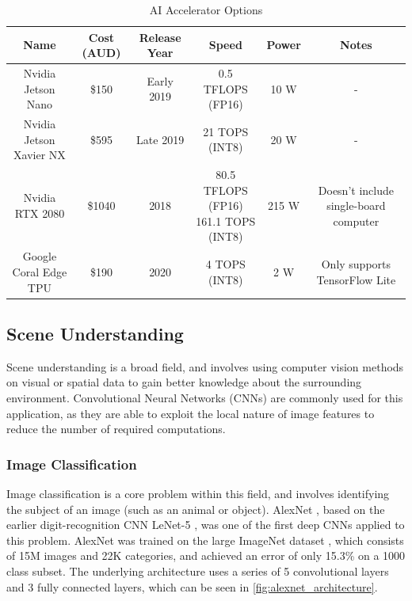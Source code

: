 \documentclass[12pt]{article}
\begin{document}
\begin{table}[H]
    \centering
\begin{adjustbox}{width=\textwidth}
    \begin{tabular}{c c c c c c}
    \toprule
    Name & Cost (AUD)\footnotemark[1] & Release Year & Speed & Power & Notes \\
    \midrule
    Nvidia Jetson Nano \cite{nvidiaJetsonNanoSystemonModule2019} & \$150 & Early 2019 & 0.5 TFLOPS (FP16) & 10 W & - \\
    Nvidia Jetson Xavier NX \cite{nvidiaJetsonXavierNX2019} & \$595 & Late 2019 & 21 TOPS (INT8) & 20 W & - \\
    Nvidia RTX 2080 \cite{nvidiaTuringGPUArchitecture2018} & \$1040 & 2018 & \makecell{80.5 TFLOPS (FP16)\\161.1 TOPS (INT8)} & 215 W & Doesn't include single-board computer \\
    Google Coral Edge TPU \cite{googlecoralCoralDevBoard2020} & \$190 & 2020 & 4 TOPS (INT8) & 2 W & Only supports TensorFlow Lite \\
    \bottomrule
    \end{tabular}
\end{adjustbox}
    \caption{AI Accelerator Options}
    \label{table:compute_element}
\end{table}

\pagebreak
\subsection{Scene Understanding}
Scene understanding is a broad field, and involves using computer vision methods
on visual or spatial data to gain better knowledge about the surrounding environment.
Convolutional Neural Networks (CNNs) are commonly used for this application, as they
are able to exploit the local nature of image features to reduce the number of required computations.

\subsubsection{Image Classification}
Image classification is a core problem within this field, and involves identifying the
subject of an image (such as an animal or object).
AlexNet \cite{krizhevskyImageNetClassificationDeep2012}, based on the earlier digit-recognition CNN LeNet-5
\cite{lecunGradientbasedLearningApplied1998}, was one of the first deep CNNs
applied to this problem. AlexNet was trained on the large ImageNet dataset \cite{jiadengImageNetLargescaleHierarchical2009},
which consists of 15M images and 22K categories,
and achieved an error of only 15.3\% on a 1000 class subset. The underlying architecture uses a series of 5 convolutional
layers and 3 fully connected layers, which can be seen in \cref{fig:alexnet_architecture}.
\end{document}
